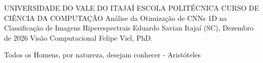 \begin{Info}
{UNIVERSIDADE DO VALE DO ITAJAÍ}
{ESCOLA POLITÉCNICA}
{CURSO DE CIÊNCIA DA COMPUTAÇÃO}
{Análise da Otimização de CNNs 1D na Classificação de Imagens Hiperespectrais}
{Eduardo Savian}
{Itajaí (SC), Dezembro de 2026}
{Visão Computacional}
{Felipe Viel, PhD.}
{}
\end{Info}



\begin{Epigrafe}
Todos os Homens, por natureza, desejam conhecer - Aristóteles
\end{Epigrafe}

